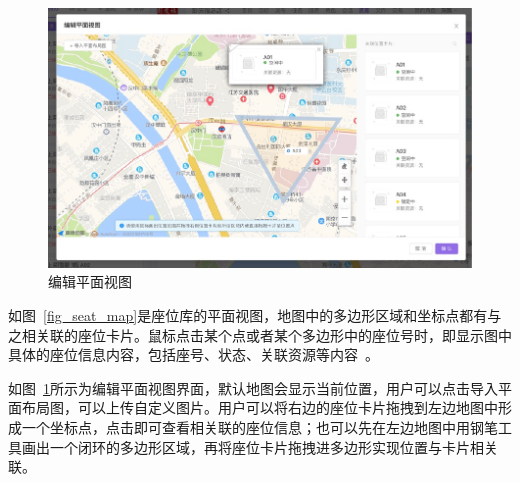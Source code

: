 \begin{figure}[htbp!]
    \centering
    \includegraphics[width=5in]{FIGs/chapter4/seat_map_edit.pdf}
    \caption{编辑平面视图}\label{fig_seat_map_edit}
\end{figure}

如图~\ref{fig_seat_map}是座位库的平面视图，地图中的多边形区域和坐标点都有与之相关联的座位卡片。鼠标点击某个点或者某个多边形中的座位号时，即显示图中具体的座位信息内容，包括座号、状态、关联资源等内容~\cite{wzz2016}。

如图~\ref{fig_seat_map_edit}所示为编辑平面视图界面，默认地图会显示当前位置，用户可以点击导入平面布局图，可以上传自定义图片。用户可以将右边的座位卡片拖拽到左边地图中形成一个坐标点，点击即可查看相关联的座位信息；也可以先在左边地图中用钢笔工具画出一个闭环的多边形区域，再将座位卡片拖拽进多边形实现位置与卡片相关联。\\

